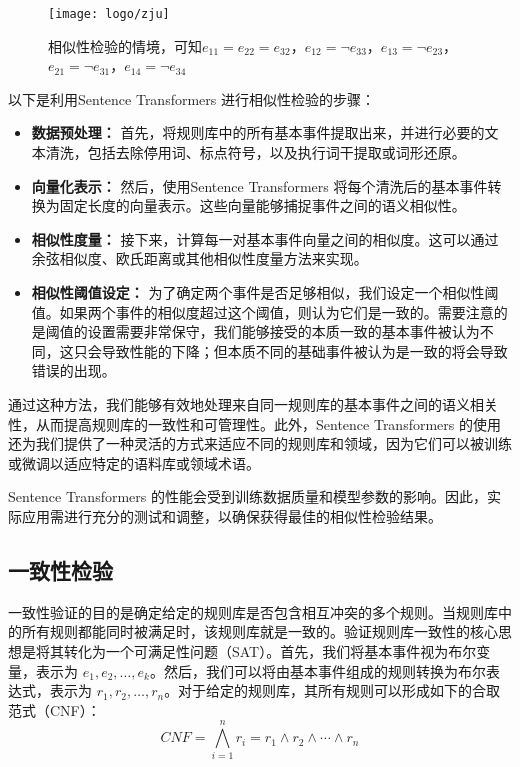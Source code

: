 \begin{figure}[ht]
    \centering
    \texttt{[image: logo/zju]}
    \caption{相似性检验的情境，可知$e_{11} = e_{22} = e_{32}$，$e_{12} = \neg e_{33}$，$e_{13} = \neg e_{23}$，$e_{21} = \neg e_{31}$，$e_{14} = \neg e_{34}$}
\end{figure}

以下是利用Sentence Transformers 进行相似性检验的步骤：
\begin{itemize}
    \item \textbf{数据预处理：} 首先，将规则库中的所有基本事件提取出来，并进行必要的文本清洗，包括去除停用词、标点符号，以及执行词干提取或词形还原。
    \item \textbf{向量化表示：} 然后，使用Sentence Transformers 将每个清洗后的基本事件转换为固定长度的向量表示。这些向量能够捕捉事件之间的语义相似性。
    \item \textbf{相似性度量：} 接下来，计算每一对基本事件向量之间的相似度。这可以通过余弦相似度、欧氏距离或其他相似性度量方法来实现。
    \item \textbf{相似性阈值设定：} 为了确定两个事件是否足够相似，我们设定一个相似性阈值。如果两个事件的相似度超过这个阈值，则认为它们是一致的。需要注意的是阈值的设置需要非常保守，我们能够接受的本质一致的基本事件被认为不同，这只会导致性能的下降；但本质不同的基础事件被认为是一致的将会导致错误的出现。
\end{itemize}

通过这种方法，我们能够有效地处理来自同一规则库的基本事件之间的语义相关性，从而提高规则库的一致性和可管理性。此外，Sentence Transformers 的使用还为我们提供了一种灵活的方式来适应不同的规则库和领域，因为它们可以被训练或微调以适应特定的语料库或领域术语。

Sentence Transformers 的性能会受到训练数据质量和模型参数的影响。因此，实际应用需进行充分的测试和调整，以确保获得最佳的相似性检验结果。

\subsection{一致性检验}

一致性验证的目的是确定给定的规则库是否包含相互冲突的多个规则。当规则库中的所有规则都能同时被满足时，该规则库就是一致的。验证规则库一致性的核心思想是将其转化为一个可满足性问题（SAT）。首先，我们将基本事件视为布尔变量，表示为 $e_1, e_2, \ldots, e_k$。然后，我们可以将由基本事件组成的规则转换为布尔表达式，表示为 $r_1, r_2, \ldots, r_n$。对于给定的规则库，其所有规则可以形成如下的合取范式（CNF）：
$$CNF=\bigwedge_{i=1}^{n}r_i=r_1 \land r_2 \land \cdots \land r_n$$

